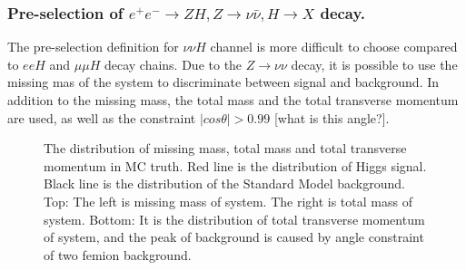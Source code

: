 \documentclass[11pt,a4paper]{cepcnote}
\begin{document}
\subsubsection{Pre-selection of $e^+e^- \rightarrow ZH, Z\rightarrow \nu\bar{\nu}, H\rightarrow X$ decay.}
The pre-selection definition for $\nu\nu H$ channel is more difficult to choose compared to
$eeH$ and $\mu\mu H$ decay chains. Due to the $Z\to\nu\nu$ decay, it is possible to use the missing mas
of the system to discriminate between signal and background. In addition to the missing mass, the total mass
and the total transverse momentum are used, as well as the constraint $|cos\theta| > 0.99$ [what is this angle?].
\begin{figure}[H]
	\centering
	\caption[]{The distribution of missing mass, total mass and total transverse momentum in MC truth. 
	Red line is the distribution of Higgs signal. Black line is the distribution of the Standard Model background.
	Top: The left is missing mass of system. The right is total mass of system.
	Bottom: It is the distribution of total transverse momentum of system, and the peak of background is caused by angle constraint of 
	two femion background.}
	\label{fig:nnHfilter}
\end{figure}
\end{document}

